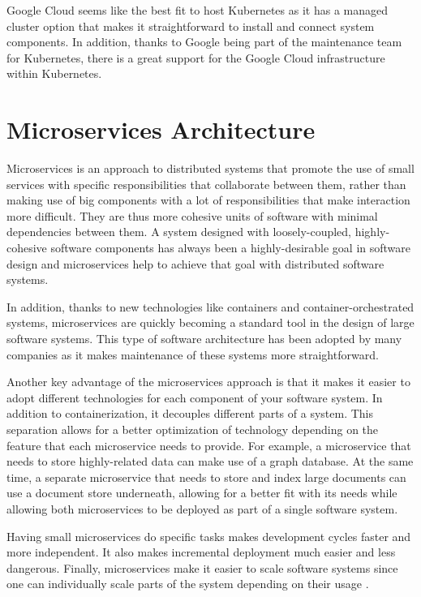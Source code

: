 Google Cloud seems like the best fit to host Kubernetes as it has a managed cluster option that makes it straightforward to install and connect system components. In addition, thanks to Google being part of the maintenance team for Kubernetes, there is a great support for the Google Cloud infrastructure within Kubernetes.

\section{Microservices Architecture}

Microservices is an approach to distributed systems that promote the use of small services with specific responsibilities that collaborate between them, rather than making use of big components with a lot of responsibilities that make interaction more difficult. They are thus more cohesive units of software with minimal dependencies between them. A system designed with loosely-coupled, highly-cohesive software components has always been a highly-desirable goal in software design \parencite{gradybook} and microservices help to achieve that goal with distributed software systems.

In addition, thanks to new technologies like containers and container-orchestrated systems, microservices are quickly becoming a standard tool in the design of large software systems. This type of software architecture has been adopted by many companies as it makes maintenance of these systems more straightforward.

Another key advantage of the microservices approach is that it makes it easier to adopt different technologies for each component of your software system. In addition to containerization, it decouples different parts of a system. This separation allows for a better optimization of technology depending on the feature that each microservice needs to provide. For example, a microservice that needs to store highly-related data can make use of a graph database. At the same time, a separate microservice that needs to store and index large documents can use a document store underneath, allowing for a better fit with its needs while allowing both microservices to be deployed as part of a single software system.

Having small microservices do specific tasks makes development cycles faster and more independent. It also makes incremental deployment much easier and less dangerous. Finally, microservices make it easier to scale software systems since one can individually scale parts of the system depending on their usage \parencite{microservicesScale}.

